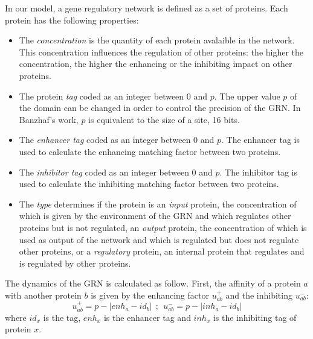 In our model, a
gene regulatory network is defined as a set of proteins. Each protein has the
following properties:
\begin{itemize}
\item The \emph{concentration} is the quantity of each protein avalaible in the network. This concentration influences the regulation of other proteins: the higher the concentration, the higher the enhancing or the inhibiting impact on other proteins.

\item The protein \emph{tag} coded as an integer between 0 and $p$. The
	upper value $p$ of the domain can be changed in order to control the
	precision of the GRN. In Banzhaf's work, $p$ is equivalent to the size
of a site, 16 bits. 

\item The \emph{enhancer tag} coded as an integer between 0 and $p$. The
	enhancer tag is used to calculate the enhancing matching factor
	between two proteins.

\item The \emph{inhibitor tag} coded as an integer between 0 and $p$. The
	inhibitor tag is used to calculate the inhibiting matching factor
	between two proteins.

\item The \emph{type} determines if the protein is an \emph{input} protein, the
	concentration of which is given by the environment of the GRN and which
	regulates other proteins but is not regulated, an \emph{output} protein,
	the concentration of which is used as output of the network and which is
	regulated but does not regulate other proteins, or a \emph{regulatory}
	protein, an internal protein that regulates and is regulated by other
	proteins.

\end{itemize}

The dynamics of the GRN is calculated as follow. First, the affinity of a
protein $a$ with another protein $b$ is given by the enhancing factor
$u^{+}_{ab}$ and the inhibiting $u^{-}_{ab}$:
\begin{equation}
u^{+}_{ab}=p-|enh_a-id_b|~~;~~u^{-}_{ab}=p-|inh_a-id_b|
\end{equation}
where $id_x$ is the tag, $enh_x$ is the enhancer tag and $inh_x$
is the inhibiting tag of protein $x$.

